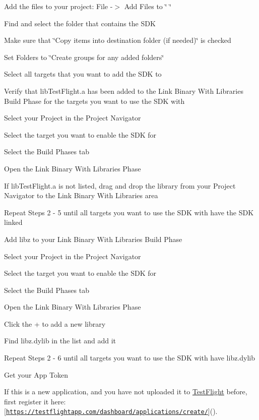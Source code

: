 \begin{DoxyEnumerate}
\item Add the files to your project\-: File -\/$>$ Add Files to \char`\"{} \char`\"{}
\begin{DoxyEnumerate}
\item Find and select the folder that contains the S\-D\-K
\item Make sure that \char`\"{}\-Copy items into destination folder (if needed)\char`\"{} is checked
\item Set Folders to \char`\"{}\-Create groups for any added folders\char`\"{}
\item Select all targets that you want to add the S\-D\-K to
\end{DoxyEnumerate}
\item Verify that lib\-Test\-Flight.\-a has been added to the Link Binary With Libraries Build Phase for the targets you want to use the S\-D\-K with
\begin{DoxyEnumerate}
\item Select your Project in the Project Navigator
\item Select the target you want to enable the S\-D\-K for
\item Select the Build Phases tab
\item Open the Link Binary With Libraries Phase
\item If lib\-Test\-Flight.\-a is not listed, drag and drop the library from your Project Navigator to the Link Binary With Libraries area
\item Repeat Steps 2 -\/ 5 until all targets you want to use the S\-D\-K with have the S\-D\-K linked
\end{DoxyEnumerate}
\item Add libz to your Link Binary With Libraries Build Phase
\begin{DoxyEnumerate}
\item Select your Project in the Project Navigator
\item Select the target you want to enable the S\-D\-K for
\item Select the Build Phases tab
\item Open the Link Binary With Libraries Phase
\item Click the + to add a new library
\item Find libz.\-dylib in the list and add it
\item Repeat Steps 2 -\/ 6 until all targets you want to use the S\-D\-K with have libz.\-dylib
\end{DoxyEnumerate}
\item Get your App Token
\begin{DoxyEnumerate}
\item If this is a new application, and you have not uploaded it to \hyperlink{interface_test_flight}{Test\-Flight} before, first register it here\-: \mbox{[}\href{https://testflightapp.com/dashboard/applications/create/}{\tt https\-://testflightapp.\-com/dashboard/applications/create/}\mbox{]}().


\end{DoxyEnumerate}
\end{DoxyEnumerate}
